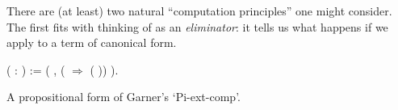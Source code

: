\documentclass[12pt]{report}
\begin{document}
   There are (at least) two natural “computation principles” one might consider.  The first fits with thinking of  as an \textit{eliminator}: it tells us what happens if we apply  to a term of canonical form. \begin{coqdoccode}
\coqdocemptyline
\coqdocnoindent
{}  ( : )\coqdoceol
\coqdocindent{1.00em}
:= (\coqdockw{\ensuremath{\forall}}   ,      (  \ensuremath{\Rightarrow}  ( ))   ).\coqdoceol
\end{coqdoccode}
A propositional form of Garner’s ‘Pi-ext-comp’. \begin{coqdoccode}
\coqdocemptyline
\end{coqdoccode}
\end{document}
